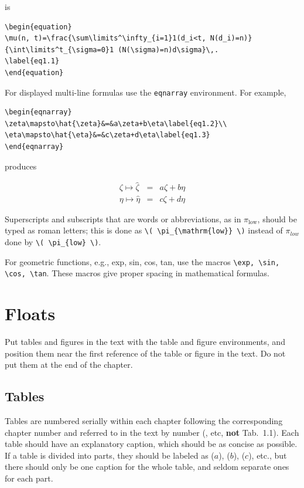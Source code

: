 \noindent is

\begin{verbatim}
\begin{equation}
\mu(n, t)=\frac{\sum\limits^\infty_{i=1}1(d_i<t, N(d_i)=n)}
{\int\limits^t_{\sigma=0}1 (N(\sigma)=n)d\sigma}\,.
\label{eq1.1}
\end{equation}
\end{verbatim}

For displayed multi-line formulas use the \verb|eqnarray| environment. For
example,

\begin{verbatim}
\begin{eqnarray}
\zeta\mapsto\hat{\zeta}&=&a\zeta+b\eta\label{eq1.2}\\
\eta\mapsto\hat{\eta}&=&c\zeta+d\eta\label{eq1.3}
\end{eqnarray}
\end{verbatim}

\noindent produces

\noindent\begin{eqnarray}
\zeta\mapsto\hat{\zeta}&=&a\zeta+b\eta\label{eq1.2}\\
\eta\mapsto\hat{\eta}&=&c\zeta+d\eta\label{eq1.3}
\end{eqnarray}

Superscripts and subscripts that are words or abbreviations, as in
\( \pi_{\mathrm{low}} \), should be typed as roman letters; this is
done as \verb|\( \pi_{\mathrm{low}} \)| instead of \( \pi_{low} \)
done by \verb|\( \pi_{low} \)|.

For geometric functions, e.g., exp, sin, cos, tan, use
the macros \verb|\exp, \sin, \cos, \tan|. These macros give proper
spacing in mathematical formulas.

\section{Floats}
Put tables and figures in the text with the table and figure
environments, and position them near the first reference of the
table or figure in the text. Do not put them at the end of the
chapter.

\subsection{Tables}
Tables are numbered serially within each chapter following the
corresponding chapter number and referred to in the text by number
(, etc, {\bf not} Tab.~1.1). Each table should
have an explanatory caption, which should be as concise as possible.
If a table is divided into parts, they should be labeled as ($a$),
($b$), ($c$), etc., but there should only be one caption for the
whole table, and seldom separate ones for each part.


